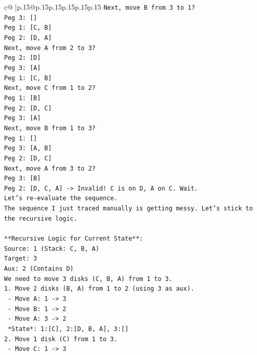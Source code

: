 \documentclass{article}
\begin{document}
{\begin{supertabular}{c@{$\;$}|p{.15\linewidth}@{}p{.15\linewidth}p{.15\linewidth}p{.15\linewidth}p{.15\linewidth}p{.15\linewidth}}
{{{\texttt{Next, move B from 3 to 1?} \\
\texttt{Peg 3: {[}{]}} \\
\texttt{Peg 1: {[}C, B{]}} \\
\texttt{Peg 2: {[}D, A{]}} \\
\texttt{Next, move A from 2 to 3?} \\
\texttt{Peg 2: {[}D{]}} \\
\texttt{Peg 3: {[}A{]}} \\
\texttt{Peg 1: {[}C, B{]}} \\
\texttt{Next, move C from 1 to 2?} \\
\texttt{Peg 1: {[}B{]}} \\
\texttt{Peg 2: {[}D, C{]}} \\
\texttt{Peg 3: {[}A{]}} \\
\texttt{Next, move B from 1 to 3?} \\
\texttt{Peg 1: {[}{]}} \\
\texttt{Peg 3: {[}A, B{]}} \\
\texttt{Peg 2: {[}D, C{]}} \\
\texttt{Next, move A from 3 to 2?} \\
\texttt{Peg 3: {[}B{]}} \\
\texttt{Peg 2: {[}D, C, A{]} {-}> Invalid! C is on D, A on C. Wait.} \\
\texttt{Let's re{-}evaluate the sequence.} \\
\texttt{The sequence I just traced manually is getting messy. Let's stick to the recursive logic.} \\
\\ 
\texttt{**Recursive Logic for Current State**:} \\
\texttt{Source: 1 (Stack: C, B, A)} \\
\texttt{Target: 3} \\
\texttt{Aux: 2 (Contains D)} \\
\texttt{We need to move 3 disks (C, B, A) from 1 to 3.} \\
\texttt{1. Move 2 disks (B, A) from 1 to 2 (using 3 as aux).} \\
\texttt{   {-} Move A: 1 {-}> 3} \\
\texttt{   {-} Move B: 1 {-}> 2} \\
\texttt{   {-} Move A: 3 {-}> 2} \\
\texttt{   *State*: 1:{[}C{]}, 2:{[}D, B, A{]}, 3:{[}{]}} \\
\texttt{2. Move 1 disk (C) from 1 to 3.} \\
\texttt{   {-} Move C: 1 {-}> 3} \\
}}}
\end{supertabular}}
\end{document}
